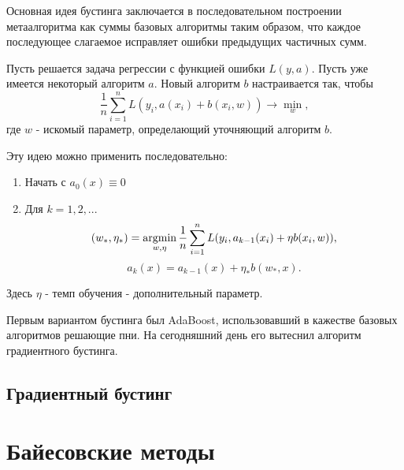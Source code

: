 Основная идея бустинга заключается в последовательном построении метаалгоритма как суммы базовых алгоритмы таким образом, что каждое последующее слагаемое исправляет ошибки предыдущих частичных сумм.

Пусть решается задача регрессии с функцией ошибки $L(y, a)$. Пусть уже имеется некоторый алгоритм $a$. Новый алгоритм $b$ настраивается так, чтобы 
$$
\frac{1}{n}\sum_{i=1}^nL(y_i, a(x_i) + b(x_i, w)) \rightarrow \min_w,
$$
где $w$ - искомый параметр, определающий уточняющий алгоритм $b$.

Эту идею можно применить последовательно:
\begin{enumerate}
    \item Начать с $a_0(x) \equiv 0$ 
    \item Для $k = 1, 2, ...$ 
$$
(w_*, \eta_*) = \operatorname*{argmin}_{w, \eta} \frac{1}{n}\sum_{i=1}^nL(y_i, a_{k-1}(x_i) + \eta b(x_i, w)),
$$
$$
a_k(x) = a_{k-1}(x) + \eta_*b(w_*, x).
$$
\end{enumerate}
Здесь $\eta$ - темп обучения - дополнительный параметр.

Первым вариантом бустинга был AdaBoost, использовавший в кажестве базовых алгоритмов решающие пни. На сегодняшний день его вытеснил алгоритм градиентного бустинга.

\subsection{Градиентный бустинг}



\section{Байесовские методы}



